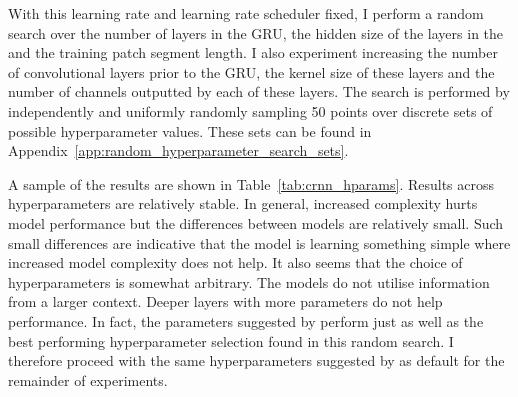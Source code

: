 With this learning rate and learning rate scheduler fixed, I perform a random search over the number of layers in the GRU, the hidden size of the layers in the and the training patch segment length. I also experiment increasing the number of convolutional layers prior to the GRU, the kernel size of these layers and the number of channels outputted by each of these layers. The search is performed by independently and uniformly randomly sampling 50 points over discrete sets of possible hyperparameter values. These sets can be found in Appendix~\ref{app:random_hyperparameter_search_sets}. 

A sample of the results are shown in Table~\ref{tab:crnn_hparams}. Results across hyperparameters are relatively stable. In general, increased complexity hurts model performance but the differences between models are relatively small. Such small differences are indicative that the model is learning something simple where increased model complexity does not help. It also seems that the choice of hyperparameters is somewhat arbitrary. The models do not utilise information from a larger context. Deeper layers with more parameters do not help performance. In fact, the parameters suggested by \citet{StructuredTraining} perform just as well as the best performing hyperparameter selection found in this random search. I therefore proceed with the same hyperparameters suggested by \citet{StructuredTraining} as default for the remainder of experiments.

